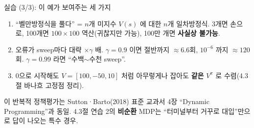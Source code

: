 \begin{frame}{실습 (3/3): 이 예가 보여주는 세 가지}
  \begin{enumerate}
    \item {} ``벨만방정식을 풀다'' =
      $n$개 미지수 $V(s)$ 에 대한 $n$개 일차방정식. 3개면
      손으로, 100개면 $100 \times 100$ 역산(귀찮지만 가능),
      100만 개면 \textbf{사실상 불가능}.
    \item {} 오류가 sweep마다 대략
      $\times \gamma$ 배. $\gamma = 0.9$ 이면 절반까지
      $\approx 6.6$회, $10^{-6}$ 까지 $\approx 120$회.
      $\gamma = 0.99$ 라면 ``수백$\sim$수천 sweep''.
    \item {} 0으로 시작해도
      $V = [100, -50, 10]$ 처럼 아무렇게나 잡아도 \textbf{같은}
      $V^\pi$ 로 수렴(4.3절 바나흐 고정점 정리).
  \end{enumerate}
  {\footnotesize 이 반복적 정책평가는 Sutton·Barto(2018) 표준
  교과서 4장 ``Dynamic Programming''과 동일. 4.3절 연습 2의
  \textbf{비순환} MDP는 ``터미널부터 거꾸로 대입''만으로 답이
  나오는 특수 경우.}
\end{frame}
